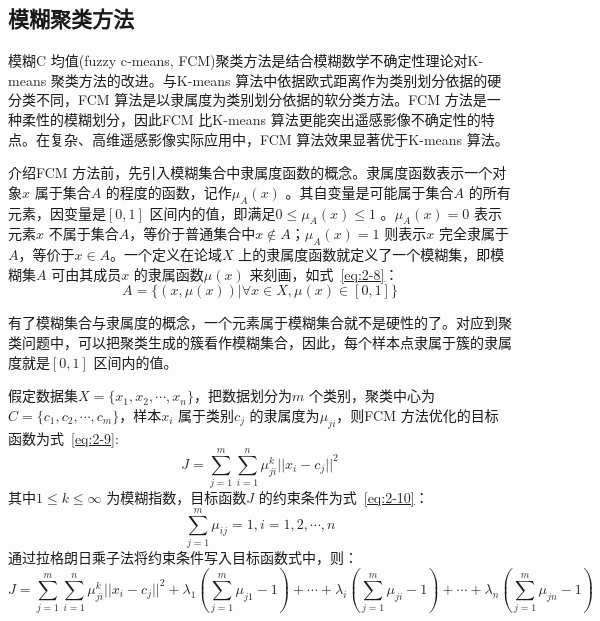 \subsection{模糊聚类方法}
\label{subsec:chap02-1-2}

模糊C 均值(fuzzy c-means, FCM)聚类方法是结合模糊数学不确定性理论对K-means 聚类方法的改进。与K-means 算法中依据欧式距离作为类别划分依据的硬分类不同，FCM 算法是以隶属度为类别划分依据的软分类方法。FCM 方法是一种柔性的模糊划分，因此FCM 比K-means 算法更能突出遥感影像不确定性的特点。在复杂、高维遥感影像实际应用中，FCM 算法效果显著优于K-means 算法。

介绍FCM 方法前，先引入模糊集合中隶属度函数的概念。隶属度函数表示一个对象$x$ 属于集合$A$ 的程度的函数，记作$\mu_{A}(x)$ 。其自变量是可能属于集合$A$ 的所有元素，因变量是$[0,1]$ 区间内的值，即满足$0 \leq \mu_{A}(x) \leq 1$ 。$\mu_{A}(x) = 0$ 表示元素$x$ 不属于集合$A$，等价于普通集合中$x \notin A$；$\mu_{A}(x) = 1$ 则表示$x$ 完全隶属于$A$，等价于$x \in A$。一个定义在论域$X$ 上的隶属度函数就定义了一个模糊集，即模糊集$A$ 可由其成员$x$ 的隶属函数$\mu (x)$ 来刻画，如式~\ref{eq:2-8}：
\begin{equation}
  \label{eq:2-8}
  A = \{(x,\mu (x)) | \forall x \in X,\mu (x) \in [0,1] \}
\end{equation}

有了模糊集合与隶属度的概念，一个元素属于模糊集合就不是硬性的了。对应到聚类问题中，可以把聚类生成的簇看作模糊集合，因此，每个样本点隶属于簇的隶属度就是$[0,1]$ 区间内的值。

假定数据集$X=\{x_1,x_2,\cdots,x_n \}$，把数据划分为$m$ 个类别，聚类中心为$C = \{c_1,c_2,\cdots,c_m \}$，样本$x_i$ 属于类别$c_j$ 的隶属度为$\mu_{ji}$，则FCM 方法优化的目标函数为式~\ref{eq:2-9}:
\begin{equation}
  \label{eq:2-9}
  J= \sum_{j=1}^m \sum_{i=1}^n \mu_{ji}^k||x_i-c_j||^2
\end{equation}
其中$1 \leq k \leq \infty$ 为模糊指数，目标函数$J$ 的约束条件为式~\ref{eq:2-10}：
\begin{equation}
  \label{eq:2-10}
  \sum_{j=1}^m \mu_{ij} = 1, i=1,2,\cdots,n
\end{equation}
通过拉格朗日乘子法将约束条件写入目标函数式中，则：
\begin{equation}
  \label{eq:2-11}
  J = \sum_{j=1}^m \sum_{i=1}^n \mu_{ji}^k||x_i-c_j||^2 + \lambda_1(\sum_{j=1}^m \mu_{j1} -1 )  + \cdots + \lambda_i(\sum_{j=1}^m \mu_{ji} -1 ) + \cdots + \lambda_n(\sum_{j=1}^m \mu_{jn} -1 )
\end{equation}


